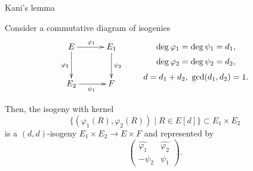\begin{frame}{Kani's lemma}
    \begin{lemma}
        Consider a commutative diagram of isogenies
        \vspace{-10pt}
        \begin{align*}
            \xymatrix@C=30pt@R=30pt{
                E \ar[r]^{\varphi_1} \ar[d]_{\varphi_2} & E_1 \ar[d]^{\psi_2}\\
                E_2 \ar[r]_{\psi_1} & F
            }
            \qquad
            \xymatrix@R=0.3em{
                \deg\varphi_1 = \deg\psi_1 = d_1,\\
                \deg\varphi_2 = \deg\psi_2 = d_2,\\
                d = d_1 + d_2,\  \gcd(d_1, d_2) = 1.
            }
        \end{align*}

        Then, the isogeny with kernel
        $$\{(\varphi_1(R), \varphi_2(R)) \mid R \in E[d]\} \subset E_1 \times E_2$$
        is a $(d,d)$-isogeny $E_1 \times E_2 \to E \times F$ and represented by
        \vspace{-10pt}
        \begin{equation*}
            \begin{pmatrix}
                \hat{\varphi_1} & \hat{\varphi_2}\\
                -\psi_2 & \psi_1
            \end{pmatrix}.
        \end{equation*}
    \end{lemma}
\end{frame}

